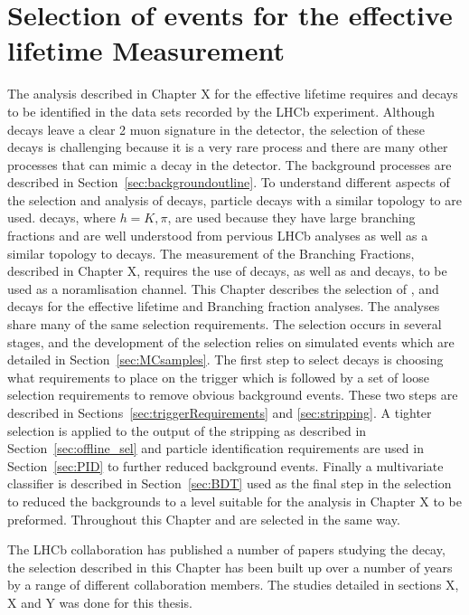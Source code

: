 \chapter{Selection of \bsmumu events for the effective lifetime Measurement}
\label{selection_chapter}
The analysis described in Chapter X for the \bsmumu effective lifetime requires \bsmumu and \bhh decays to be identified in the data sets recorded by the LHCb experiment. Although \bsmumu decays leave a clear 2 muon signature in the detector, the selection of these decays is challenging because it is a very rare process and there are many other processes that can mimic a \BsMuMu decay in the detector. The background processes are described in Section~\ref{sec:backgroundoutline}. To understand different aspects of the selection and analysis of \BsMuMu decays, particle decays with a similar topology to \BsMuMu are used. \bhh decays, where $h = K, \pi$, are used because they have large branching fractions and are well understood from pervious LHCb analyses as well as a similar topology to \bsmumu decays. 
The measurement of the \bmumu Branching Fractions, described in Chapter X, requires the use of \bujpsik decays, as well as \bmumu and \bhh decays, to be used as a noramlisation channel.
This Chapter describes the selection of \bmumu, \bhh and \bujpsik decays for the effective lifetime and Branching fraction analyses. The analyses share many of the same selection requirements. The selection occurs in several stages, and the development of the selection relies on simulated events which are detailed in Section~\ref{sec:MCsamples}. The first step to select decays is choosing what requirements to place on the trigger which is followed by a set of loose selection requirements to remove obvious background events. These two steps are described in Sections~\ref{sec:triggerRequirements} and \ref{sec:stripping}. A tighter selection is applied to the output of the stripping as described in Section~\ref{sec:offline_sel} and particle identification requirements are used in Section~\ref{sec:PID} to further reduced background events. Finally a multivariate classifier is described in Section~\ref{sec:BDT} used as the final step in the selection to reduced the backgrounds to a level suitable for the analysis in Chapter X to be preformed. Throughout this Chapter \bsmumu and \bdmumu are selected in the same way.

The LHCb collaboration has published a number of papers studying the \bsmumu decay, the selection described in this Chapter has been built up over a number of years by a range of different collaboration members. The studies detailed in sections X, X and Y was done for this thesis.





